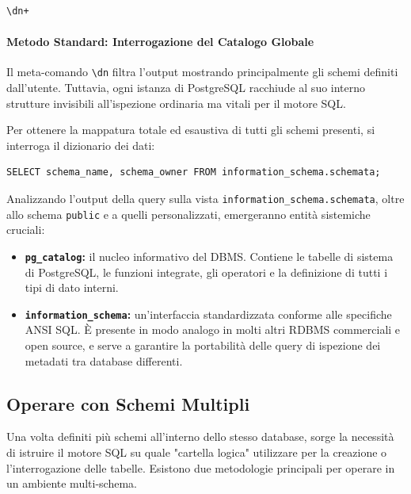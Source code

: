 \begin{lstlisting}[language=bash, title=Ispezione estesa degli schemi]
\dn+
\end{lstlisting}

\paragraph{Metodo Standard: Interrogazione del Catalogo Globale}

Il meta-comando \texttt{\textbackslash dn} filtra l'output mostrando principalmente gli schemi definiti dall'utente. Tuttavia, ogni istanza di PostgreSQL racchiude al suo interno strutture invisibili all'ispezione ordinaria ma vitali per il motore SQL. 

Per ottenere la mappatura totale ed esaustiva di tutti gli schemi presenti, si interroga il dizionario dei dati:

\begin{lstlisting}[language=PostgreSQL, title=Query completa sulle strutture logiche]
SELECT schema_name, schema_owner FROM information_schema.schemata;
\end{lstlisting}

\begin{dettagli}
Analizzando l'output della query sulla vista \texttt{information\_schema.schemata}, oltre allo schema \texttt{public} e a quelli personalizzati, emergeranno entità sistemiche cruciali:
\begin{itemize}
    \item \textbf{\texttt{pg\_catalog}:} il nucleo informativo del DBMS. Contiene le tabelle di sistema di PostgreSQL, le funzioni integrate, gli operatori e la definizione di tutti i tipi di dato interni.
    \item \textbf{\texttt{information\_schema}:} un'interfaccia standardizzata conforme alle specifiche ANSI SQL. È presente in modo analogo in molti altri RDBMS commerciali e open source, e serve a garantire la portabilità delle query di ispezione dei metadati tra database differenti.
\end{itemize}
\end{dettagli}

\subsection{Operare con Schemi Multipli}

Una volta definiti più schemi all'interno dello stesso database, sorge la necessità di istruire il motore SQL su quale "cartella logica" utilizzare per la creazione o l'interrogazione delle tabelle. Esistono due metodologie principali per operare in un ambiente multi-schema.

